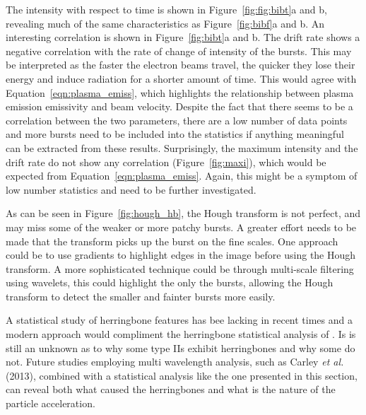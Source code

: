 The intensity with respect to time is shown in Figure~\ref{fig:fig:bibt}a and b, revealing much of the same characteristics as Figure~\ref{fig:bibf}a and b. An interesting correlation is shown in Figure~\ref{fig:bibt}a and b. The drift rate shows a negative correlation with the rate of change of intensity of the bursts. This may be interpreted as the faster the electron beams travel, the quicker they lose their energy and induce radiation for a shorter amount of time. This would agree with Equation~\ref{eqn:plasma_emiss}, which highlights the relationship between plasma emission emissivity and beam velocity.  Despite the fact that there seems to be a correlation between the two parameters, there are a low number of data points and more bursts need to be included into the statistics if anything meaningful can be extracted from these results. Surprisingly, the maximum intensity and the drift rate do not show any correlation (Figure~\ref{fig:maxi}), which would be expected from Equation~\ref{eqn:plasma_emiss}. Again, this might be a symptom of low number statistics and need to be further investigated.
%
%

As can be seen in Figure~\ref{fig:hough_hb}, the Hough transform is not perfect, and may miss some of the weaker or more patchy bursts. A greater effort needs to be made that the transform picks up the burst on the fine scales. One approach could be to use gradients to highlight edges in the image before using the Hough transform. A more sophisticated technique could be through multi-scale filtering using wavelets, this could highlight the only the bursts, allowing the Hough transform to detect the smaller and fainter bursts more easily.

A statistical study of herringbone features has bee lacking in recent times and a modern approach would compliment the herringbone statistical analysis of \citep{cairns1987, mann1995}. Is is still an unknown as to why some type IIs exhibit herringbones and why some do not. Future studies employing multi wavelength analysis, such as Carley {\it et al.}\,(2013), combined with a statistical analysis like the one presented in this section, can reveal both what caused the herringbones and what is the nature of the particle acceleration.



